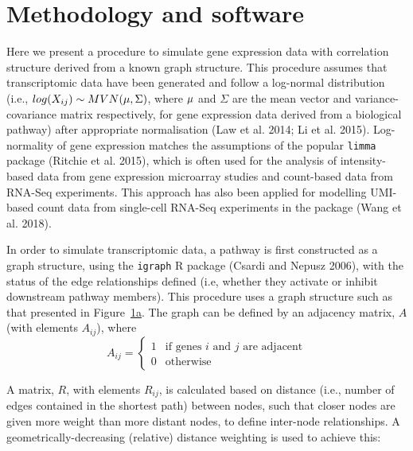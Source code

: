 \documentclass[]{article}
\begin{document}
\hypertarget{sec:methods}{%
\section{Methodology and software}\label{sec:methods}}

Here we present a procedure to simulate gene expression data with
correlation structure derived from a known graph structure. This
procedure assumes that transcriptomic data have been generated and
follow a log-normal distribution (i.e.,
\(log(X_{ij}) \sim MVN({\bf\mu}, \Sigma)\), where \({\bf\mu}\) and
\(\Sigma\) are the mean vector and variance-covariance matrix
respectively, for gene expression data derived from a biological
pathway) after appropriate normalisation (Law et al. 2014; Li et al.
2015). Log-normality of gene expression matches the assumptions of the
popular \texttt{limma} package (Ritchie et al. 2015), which is often
used for the analysis of intensity-based data from gene expression
microarray studies and count-based data from RNA-Seq experiments. This
approach has also been applied for modelling UMI-based count data from
single-cell RNA-Seq experiments in the package (Wang et al. 2018).

In order to simulate transcriptomic data, a pathway is first constructed
as a graph structure, using the \texttt{igraph} R package (Csardi and
Nepusz 2006), with the status of the edge relationships defined (i.e,
whether they activate or inhibit downstream pathway members). {This
procedure uses} a graph structure such as that presented in
Figure~\protect\hyperlink{fig:simple_graph:first}{1a}. The graph can be
defined by an adjacency matrix, \textbf{\(A\)} (with elements
\(A_{ij}\)), where \[A_{ij} = 
\begin{cases}
   1                         & \mbox{if genes } i \mbox{ and } j \mbox{ are adjacent} \\
   0                         & \mbox{otherwise}
\end{cases}\]

A matrix, \textbf{\(R\)}, with elements {\(R_{ij}\)}, is calculated
based on distance (i.e., number of edges contained in the shortest path)
between nodes, such that closer nodes are given more weight than more
distant nodes, to define inter-node relationships. A
geometrically-decreasing (relative) distance weighting is used to
achieve this:
\end{document}
